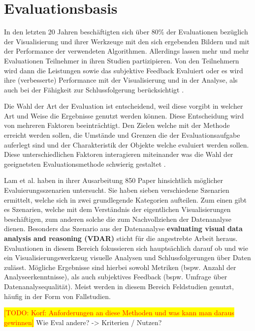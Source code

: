 \documentclass[draft=false
              ,paper=a4
              ,twoside=false
              ,fontsize=11pt
              ,headsepline
              ,BCOR10mm
              ,DIV11
              ]{scrbook}
\newcommand{\TODO}[1]{\colorbox{yellow}{\textcolor{red}{[TODO: #1]}}}
\begin{document}
\chapter{Evaluationsbasis} %
\label{cha:evaluationsbasis}
In den letzten 20 Jahren beschäftigten sich über 80\% der Evaluationen bezüglich der Visualisierung und ihrer Werkzeuge mit den sich ergebenden Bildern und mit der Performance der verwendeten Algorithmen. Allerdings lassen mehr und mehr Evaluationen Teilnehmer in ihren Studien partizipieren. Von den Teilnehmern wird dann die Leistungen sowie das subjektive Feedback Evaluiert oder es wird ihre (verbesserte) Performance mit der Visualisierung und in der Analyse, als auch bei der Fähigkeit zur Schlussfolgerung berücksichtigt \cite{isenberg_systematic_2013}. 

Die Wahl der Art der Evaluation ist entscheidend, weil diese vorgibt in welcher Art und Weise die Ergebnisse genutzt werden können. Diese Entscheidung wird von mehreren Faktoren beeinträchtigt. Den Zielen welche mit der Methode erreicht werden sollen, die Umstände und Grenzen die der Evaluationsaufgabe auferlegt sind und der Charakteristik der Objekte welche evaluiert werden sollen. Diese unterschiedlichen Faktoren interagieren miteinander was die Wahl der geeignetsten Evaluationsmethode schwierig gestaltet \cite{kitchenham_evaluating_1996-2}.

Lam et al. haben in ihrer Ausarbeitung \cite{lam_empirical_2012} 850 Paper hinsichtlich möglicher Evaluierungsszenarien untersucht. Sie haben sieben verschiedene Szenarien ermittelt, welche sich in zwei grundlegende Kategorien aufteilen. Zum einen gibt es Szenarien, welche mit dem Verständnis der eigentlichen Visualisierungen beschäftigen, zum anderen solche die zum Nachvollziehen der Datenanalyse dienen. Besonders das Szenario aus der Datenanalyse \textbf{evaluating visual data analysis and reasoning (VDAR)} sticht für die angestrebte Arbeit heraus. Evaluationen in diesem Bereich fokussieren sich hauptsächlich darauf ob und wie ein Visualisierungswerkzeug visuelle Analysen und Schlussfolgerungen über Daten zulässt. Mögliche Ergebnisse sind hierbei sowohl Metriken (bspw. Anzahl der Analyseerkenntnisse), als auch subjektives Feedback (bspw. Umfrage über Datenanalysequalität). Meist werden in diesem Bereich Feldstudien genutzt, häufig in der Form von Fallstudien.

\TODO{Korf: Anforderungen an diese Methoden und was kann man daraus gewinnen}
\iffalse
Wie Eval andere? -> Kriterien / Nutzen?
\end{document}

